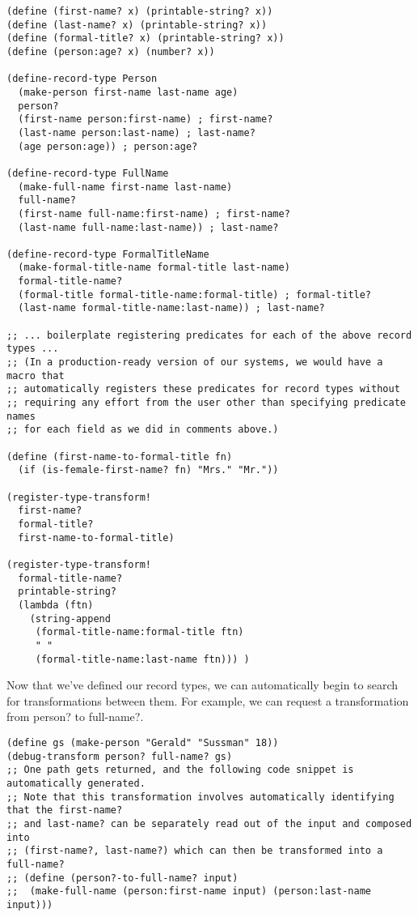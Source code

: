 \documentclass[letterpaper]{article}
\begin{document}
\begin{verbatim}
(define (first-name? x) (printable-string? x))
(define (last-name? x) (printable-string? x))
(define (formal-title? x) (printable-string? x))
(define (person:age? x) (number? x))

(define-record-type Person
  (make-person first-name last-name age)
  person?
  (first-name person:first-name) ; first-name?
  (last-name person:last-name) ; last-name?
  (age person:age)) ; person:age?

(define-record-type FullName
  (make-full-name first-name last-name)
  full-name?
  (first-name full-name:first-name) ; first-name?
  (last-name full-name:last-name)) ; last-name?

(define-record-type FormalTitleName
  (make-formal-title-name formal-title last-name)
  formal-title-name?
  (formal-title formal-title-name:formal-title) ; formal-title?
  (last-name formal-title-name:last-name)) ; last-name?

;; ... boilerplate registering predicates for each of the above record types ...
;; (In a production-ready version of our systems, we would have a macro that 
;; automatically registers these predicates for record types without 
;; requiring any effort from the user other than specifying predicate names
;; for each field as we did in comments above.)

(define (first-name-to-formal-title fn)
  (if (is-female-first-name? fn) "Mrs." "Mr."))

(register-type-transform!
  first-name? 
  formal-title? 
  first-name-to-formal-title)

(register-type-transform! 
  formal-title-name?
  printable-string? 
  (lambda (ftn) 
    (string-append 
     (formal-title-name:formal-title ftn) 
     " "
     (formal-title-name:last-name ftn))) )
\end{verbatim}

Now that we've defined our record types, we can automatically begin to search for transformations between them. For example, we can request a transformation from person? to full-name?.

\begin{verbatim}
(define gs (make-person "Gerald" "Sussman" 18))
(debug-transform person? full-name? gs)
;; One path gets returned, and the following code snippet is automatically generated.
;; Note that this transformation involves automatically identifying that the first-name? 
;; and last-name? can be separately read out of the input and composed into 
;; (first-name?, last-name?) which can then be transformed into a full-name?
;; (define (person?-to-full-name? input)
;;  (make-full-name (person:first-name input) (person:last-name input)))
\end{verbatim}
\end{document}
